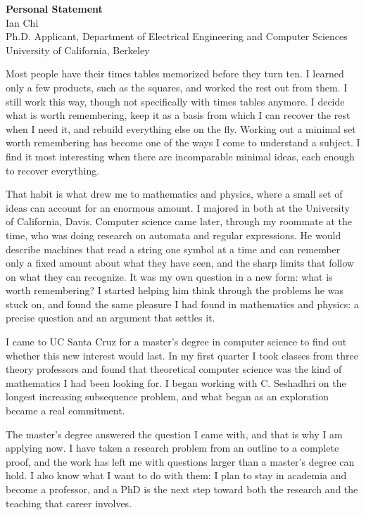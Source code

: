 \documentclass[11pt]{article}
\begin{document}
\begin{center}
  {\Large \textbf{Personal Statement}}\\[4pt]
  {\large Ian Chi}\\[2pt]
  Ph.D. Applicant, Department of Electrical Engineering and Computer Sciences\\
  University of California, Berkeley
\end{center}

\vspace{1em}


Most people have their times tables memorized before they turn ten. I learned only a few products, such as the squares, and worked the rest out from them. I still work this way, though not specifically with times tables anymore. I decide what is worth remembering, keep it as a basis from which I can recover the rest when I need it, and rebuild everything else on the fly. Working out a minimal set worth remembering has become one of the ways I come to understand a subject. I find it most interesting when there are incomparable minimal ideas, each enough to recover everything.

That habit is what drew me to mathematics and physics, where a small set of ideas can account for an enormous amount. I majored in both at the University of California, Davis. Computer science came later, through my roommate at the time, who was doing research on automata and regular expressions. He would describe machines that read a string one symbol at a time and can remember only a fixed amount about what they have seen, and the sharp limits that follow on what they can recognize. It was my own question in a new form: what is worth remembering? I started helping him think through the problems he was stuck on, and found the same pleasure I had found in mathematics and physics: a precise question and an argument that settles it.

I came to UC Santa Cruz for a master's degree in computer science to find out whether this new interest would last. In my first quarter I took classes from three theory professors and found that theoretical computer science was the kind of mathematics I had been looking for. I began working with C. Seshadhri on the longest increasing subsequence problem, and what began as an exploration became a real commitment.

The master's degree answered the question I came with, and that is why I am applying now. I have taken a research problem from an outline to a complete proof, and the work has left me with questions larger than a master's degree can hold. I also know what I want to do with them: I plan to stay in academia and become a professor, and a PhD is the next step toward both the research and the teaching that career involves.
\end{document}
